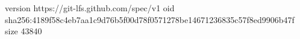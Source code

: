 version https://git-lfs.github.com/spec/v1
oid sha256:4189f58c4eb7aa1c9d76b5f00d78f0571278be14671236835c57f8ed9906b47f
size 43840
